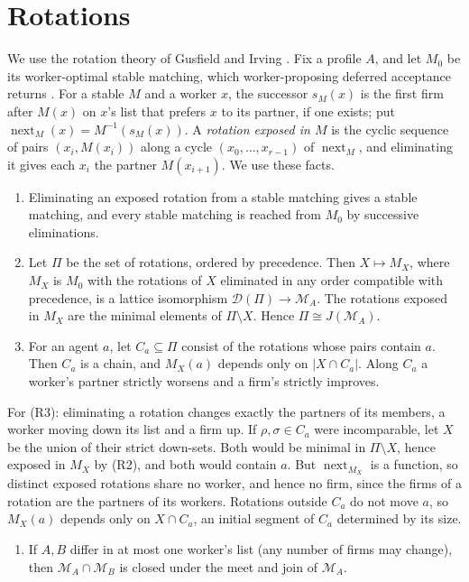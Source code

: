 \documentclass[11pt]{article}
\theoremstyle{definition}
\theoremstyle{remark}
\newcommand{\D}{\mathcal D}
\newcommand{\nxt}{\operatorname{next}}
\begin{document}
\section{Rotations}

We use the rotation theory of Gusfield and Irving \cite[Ch.~2--3]{GI}. Fix a profile $A$, and let $M_0$ be its worker-optimal stable matching, which worker-proposing deferred acceptance returns \cite{GS}. For a stable $M$ and a worker $x$, the successor $s_M(x)$ is the first firm after $M(x)$ on $x$'s list that prefers $x$ to its partner, if one exists; put $\nxt_M(x)=M^{-1}(s_M(x))$. A \emph{rotation exposed in $M$} is the cyclic sequence of pairs $(x_i,M(x_i))$ along a cycle $(x_0,\dots,x_{r-1})$ of $\nxt_M$, and eliminating it gives each $x_i$ the partner $M(x_{i+1})$. We use these facts.

\begin{enumerate}[label=(R\arabic*)]
\item Eliminating an exposed rotation from a stable matching gives a stable matching, and every stable matching is reached from $M_0$ by successive eliminations.
\item Let $\Pi$ be the set of rotations, ordered by precedence. Then $X\mapsto M_X$, where $M_X$ is $M_0$ with the rotations of $X$ eliminated in any order compatible with precedence, is a lattice isomorphism $\D(\Pi)\to\mathcal M_A$. The rotations exposed in $M_X$ are the minimal elements of $\Pi\setminus X$. Hence $\Pi\cong J(\mathcal M_A)$.
\item For an agent $a$, let $C_a\subseteq\Pi$ consist of the rotations whose pairs contain $a$. Then $C_a$ is a chain, and $M_X(a)$ depends only on $|X\cap C_a|$. Along $C_a$ a worker's partner strictly worsens and a firm's strictly improves.
\end{enumerate}

For (R3): eliminating a rotation changes exactly the partners of its members, a worker moving down its list and a firm up. If $\rho,\sigma\in C_a$ were incomparable, let $X$ be the union of their strict down-sets. Both would be minimal in $\Pi\setminus X$, hence exposed in $M_X$ by (R2), and both would contain $a$. But $\nxt_{M_X}$ is a function, so distinct exposed rotations share no worker, and hence no firm, since the firms of a rotation are the partners of its workers. Rotations outside $C_a$ do not move $a$, so $M_X(a)$ depends only on $X\cap C_a$, an initial segment of $C_a$ determined by its size.

\begin{enumerate}[label=(R\arabic*),resume]
\item \cite[Theorem~7]{GMRV} If $A,B$ differ in at most one worker's list (any number of firms may change), then $\mathcal M_A\cap\mathcal M_B$ is closed under the meet and join of $\mathcal M_A$.
\end{enumerate}
\end{document}
